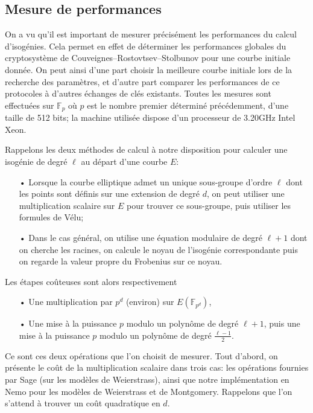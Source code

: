 \documentclass[11pt,a4paper]{article}
\newcommand{\F}{\mathbb{F}}
\theoremstyle{definition}
\begin{document}
\subsection{Mesure de performances}

On a vu qu'il est important de mesurer précisément les performances du calcul d'isogénies. Cela permet en effet de déterminer les performances globales du cryptosystème de Couveignes--Rostovtsev--Stolbunov pour une courbe initiale donnée. On peut ainsi d'une part choisir la meilleure courbe initiale lors de la recherche des paramètres, et d'autre part comparer les performances de ce protocoles à d'autres échanges de clés existants. Toutes les mesures sont effectuées sur $\F_p$ où $p$ est le nombre premier déterminé précédemment, d'une taille de 512 bits; la machine utilisée dispose d'un processeur de 3.20GHz Intel Xeon.

Rappelons les deux méthodes de calcul à notre disposition pour calculer une isogénie de degré $\ell$ au départ d'une courbe $E$:
\begin{itemize}
\item[•] Lorsque la courbe elliptique admet un unique sous-groupe d'ordre $\ell$ dont les points sont définis sur une extension de degré $d$, on peut utiliser une multiplication scalaire sur $E$ pour trouver ce sous-groupe, puis utiliser les formules de Vélu;
\item[•] Dans le cas général, on utilise une équation modulaire de degré $\ell + 1$ dont on cherche les racines, on calcule le noyau de l'isogénie correspondante puis on regarde la valeur propre du Frobenius sur ce noyau.
\end{itemize}
Les étapes coûteuses sont alors respectivement
\begin{itemize}
\item[•] Une multiplication par $p^d$ (environ) sur $E(\F_{p^d})$,
\item[•] Une mise à la puissance $p$ modulo un polynôme de degré $\ell + 1$, puis une mise à la puissance $p$ modulo un polynôme de degré $\frac{\ell - 1}{2}$.
\end{itemize}
Ce sont ces deux opérations que l'on choisit de mesurer. Tout d'abord, on présente le coût de la multiplication scalaire dans trois cas: les opérations fournies par Sage (sur les modèles de Weierstrass), ainsi que notre implémentation en Nemo pour les modèles de Weierstrass et de Montgomery. Rappelons que l'on s'attend à trouver un coût quadratique en $d$.
\end{document}
